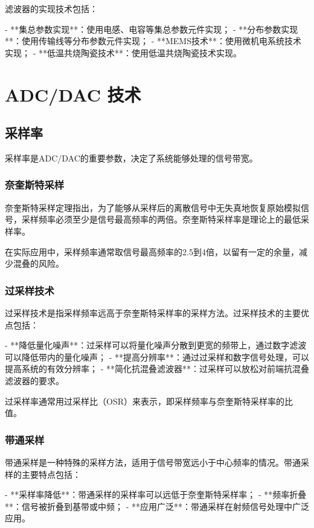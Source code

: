 ﻿\documentclass[UTF8]{ctexbook}
\begin{document}
滤波器的实现技术包括：

- **集总参数实现**：使用电感、电容等集总参数元件实现；
- **分布参数实现**：使用传输线等分布参数元件实现；
- **MEMS技术**：使用微机电系统技术实现；
- **低温共烧陶瓷技术**：使用低温共烧陶瓷技术实现。
\section{ADC/DAC 技术}

\subsection{采样率}

采样率是ADC/DAC的重要参数，决定了系统能够处理的信号带宽。

\subsubsection{奈奎斯特采样}

奈奎斯特采样定理指出，为了能够从采样后的离散信号中无失真地恢复原始模拟信号，采样频率必须至少是信号最高频率的两倍。奈奎斯特采样率是理论上的最低采样率。

在实际应用中，采样频率通常取信号最高频率的2.5到4倍，以留有一定的余量，减少混叠的风险。

\subsubsection{过采样技术}

过采样技术是指采样频率远高于奈奎斯特采样率的采样方法。过采样技术的主要优点包括：

- **降低量化噪声**：过采样可以将量化噪声分散到更宽的频带上，通过数字滤波可以降低带内的量化噪声；
- **提高分辨率**：通过过采样和数字信号处理，可以提高系统的有效分辨率；
- **简化抗混叠滤波器**：过采样可以放松对前端抗混叠滤波器的要求。

过采样率通常用过采样比（OSR）来表示，即采样频率与奈奎斯特采样率的比值。

\subsubsection{带通采样}

带通采样是一种特殊的采样方法，适用于信号带宽远小于中心频率的情况。带通采样的主要特点包括：

- **采样率降低**：带通采样的采样率可以远低于奈奎斯特采样率；
- **频率折叠**：信号被折叠到基带或中频；
- **应用广泛**：带通采样在射频信号处理中广泛应用。
\end{document}
